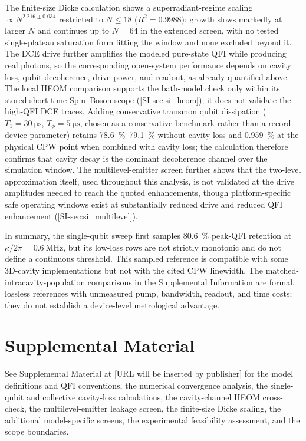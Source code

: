 \documentclass[aps,prxquantum,preprint,superscriptaddress,amsmath,amssymb]{revtex4-2}
\begin{document}
The finite-size Dicke calculation shows a superradiant-regime scaling $\propto N^{\num{2.216}\pm\num{0.034}}$ restricted to $N\le\num{18}$ ($R^2=\num{0.9988}$); growth slows markedly at larger $N$ and continues up to $N=\num{64}$ in the extended screen, with no tested single-plateau saturation form fitting the window and none excluded beyond it. The DCE drive further amplifies the modeled pure-state QFI while producing real photons, so the corresponding open-system performance depends on cavity loss, qubit decoherence, drive power, and readout, as already quantified above. The local HEOM comparison supports the bath-model check only within its stored short-time Spin--Boson scope (\cref{SI-sec:si_heom}); it does not validate the high-QFI DCE traces. Adding conservative transmon qubit dissipation ($T_1 = \qty{30}{\micro\second}$, $T_\phi = \qty{5}{\micro\second}$, chosen as a conservative benchmark rather than a record-device parameter) retains \qty{78.6}{\percent}--\qty{79.1}{\percent} without cavity loss and \qty{0.959}{\percent} at the physical CPW point when combined with cavity loss; the calculation therefore confirms that cavity decay is the dominant decoherence channel over the simulation window. The multilevel-emitter screen further shows that the two-level approximation itself, used throughout this analysis, is not validated at the drive amplitudes needed to reach the quoted enhancements, though platform-specific safe operating windows exist at substantially reduced drive and reduced QFI enhancement (\cref{SI-sec:si_multilevel}).

In summary, the single-qubit sweep first samples \qty{80.6}{\percent} peak-QFI retention at $\kappa/2\pi=\qty{0.6}{\mega\hertz}$, but its low-loss rows are not strictly monotonic and do not define a continuous threshold. This sampled reference is compatible with some 3D-cavity implementations but not with the cited CPW linewidth. The matched-intracavity-population comparisons in the Supplemental Information are formal, lossless references with unmeasured pump, bandwidth, readout, and time costs; they do not establish a device-level metrological advantage.

\section*{Supplemental Material}

See Supplemental Material at [URL will be inserted by publisher] for the model definitions and QFI conventions, the numerical convergence analysis, the single-qubit and collective cavity-loss calculations, the cavity-channel HEOM cross-check, the multilevel-emitter leakage screen, the finite-size Dicke scaling, the additional model-specific screens, the experimental feasibility assessment, and the scope boundaries.
\end{document}
